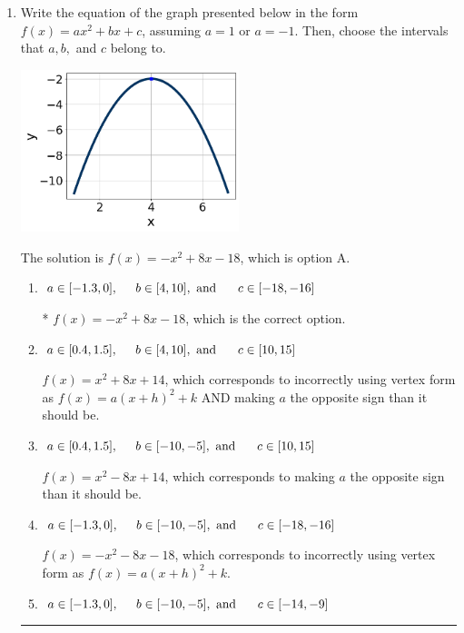 \documentclass{extbook}[14pt]
\newcommand{\litem}[1]{\item #1

\rule{\textwidth}{0.4pt}}
\begin{document}
\begin{enumerate}\litem{
Write the equation of the graph presented below in the form $f(x)=ax^2+bx+c$, assuming  $a=1$ or $a=-1$. Then, choose the intervals that $a, b,$ and $c$ belong to.

\begin{center}
    \includegraphics[width=0.5\textwidth]{../Figures/quadraticGraphToEquationA.png}
\end{center}


The solution is \( f(x) = -x^{2} +8 x -18 \), which is option A.\begin{enumerate}[label=\Alph*.]
\item \( a \in [-1.3, 0], \hspace*{5mm} b \in [4, 10], \text{ and } \hspace*{5mm} c \in [-18, -16] \)

* $f(x)=-x^{2} +8 x -18$, which is the correct option.
\item \( a \in [0.4, 1.5], \hspace*{5mm} b \in [4, 10], \text{ and } \hspace*{5mm} c \in [10, 15] \)

$f(x)=x^{2} +8 x + 14$, which corresponds to incorrectly using vertex form as $f(x) = a(x+h)^2+k$ AND making $a$ the opposite sign than it should be.
\item \( a \in [0.4, 1.5], \hspace*{5mm} b \in [-10, -5], \text{ and } \hspace*{5mm} c \in [10, 15] \)

$f(x)=x^{2} -8 x + 14$, which corresponds to making $a$ the opposite sign than it should be.
\item \( a \in [-1.3, 0], \hspace*{5mm} b \in [-10, -5], \text{ and } \hspace*{5mm} c \in [-18, -16] \)

$f(x)=-x^{2} -8 x -18$, which corresponds to incorrectly using vertex form as $f(x) = a(x+h)^2+k$.
\item \( a \in [-1.3, 0], \hspace*{5mm} b \in [-10, -5], \text{ and } \hspace*{5mm} c \in [-14, -9] \)


\end{enumerate}}
\end{enumerate}
\end{document}
